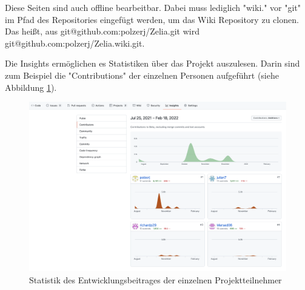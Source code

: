 Diese Seiten sind auch offline bearbeitbar. Dabei muss lediglich "wiki." vor "git" im Pfad des Repositories eingefügt werden, um das Wiki Repository zu clonen. Das heißt, aus {\ttfamily git@github.com:polzerj/Zelia.git} wird {\ttfamily git@github.com:polzerj/Zelia.wiki.git}. 


Die Insights ermöglichen es Statistiken über das Projekt auszulesen. Darin sind zum Beispiel die "Contributions" der einzelnen Personen aufgeführt (siehe Abbildung \ref{fig:insights}).

\begin{figure}[H]
    \centering
    \includegraphics[width=\textwidth]{media/ProjectManagement/Insights.png}
    \caption{Statistik des Entwicklungsbeitrages der einzelnen Projektteilnehmer}
    \label{fig:insights}
\end{figure}